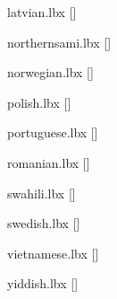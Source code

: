 \begin{filecontents*}{latvian.lbx}
    [\abx@lbxid]
\end{filecontents*}

\begin{filecontents*}{northernsami.lbx}
    [\abx@lbxid]
\end{filecontents*}

\begin{filecontents*}{norwegian.lbx}
    [\abx@lbxid]
\end{filecontents*}

\begin{filecontents*}{polish.lbx}
    [\abx@lbxid]
\end{filecontents*}

\begin{filecontents*}{portuguese.lbx}
    [\abx@lbxid]
\end{filecontents*}

\begin{filecontents*}{romanian.lbx}
    [\abx@lbxid]
\end{filecontents*}

\begin{filecontents*}{swahili.lbx}
    [\abx@lbxid]
\end{filecontents*}

\begin{filecontents*}{swedish.lbx}
    [\abx@lbxid]
\end{filecontents*}

\begin{filecontents*}{vietnamese.lbx}
    [\abx@lbxid]
\end{filecontents*}

\begin{filecontents*}{yiddish.lbx}
    [\abx@lbxid]
\end{filecontents*}